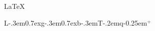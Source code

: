 \documentclass[border={1pt}]{standalone}
\begin{document}
\LaTeX

\def\LGBTQplus{{\rm \sc L\kern-.3em{\sc \raise0.7ex\hbox{g}}\kern-.3em\lower0.7ex\hbox{\sc b}\kern-.3em\hbox{T}\kern-.2em\sc q\kern-0.25em$^+$}}

\LGBTQplus
\end{document}

